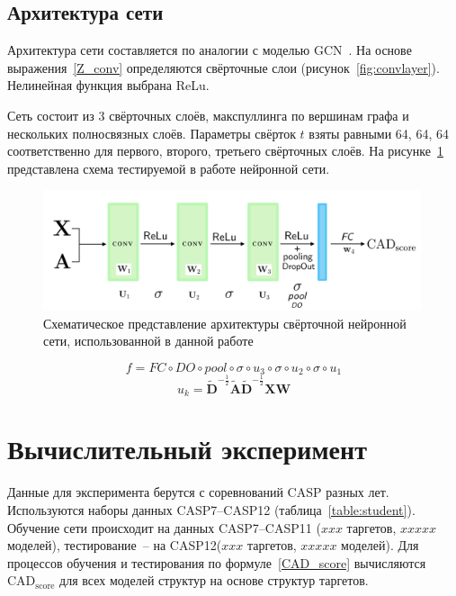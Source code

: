 \documentclass[14pt]{extarticle}
\begin{document}
\subsection{Архитектура сети}
Архитектура сети составляется по аналогии с моделью GCN~\cite{kipf_semi-supervised_2017}. На основе выражения~\eqref{Z_conv} определяются свёрточные слои (рисунок~\ref{fig:convlayer}). Нелинейная функция выбрана ReLu.

Сеть состоит из 3 свёрточных слоёв, макспуллинга по вершинам графа и нескольких полносвязных слоёв. Параметры свёрток $t$ взяты равными 64, 64, 64 соответственно для первого, второго, третьего свёрточных слоёв. На рисунке~\ref{fig:scheme} представлена схема тестируемой в работе нейронной сети.
\begin{figure}[h]
	\centering
	\includegraphics[width=0.99\textwidth]{net.pdf}
	\caption{Схематическое представление архитектуры свёрточной нейронной сети, использованной в данной работе}
	\label{fig:scheme}
\end{figure}
$$f = FC \circ DO \circ pool \circ \sigma \circ u_3\circ\sigma\circ u_2\circ\sigma\circ u_1$$
$$u_k = \tilde{\mathbf{D}}^{-\frac{1}{2}} \tilde{\mathbf{A}}\tilde{\mathbf{D}}^{-\frac{1}{2}} \mathbf{X} \mathbf{W}$$

\section{Вычислительный эксперимент}
Данные для эксперимента берутся с соревнований CASP разных лет. Используются наборы данных CASP7--CASP12 (таблица~\ref{table:student}). Обучение сети происходит на данных CASP7--CASP11 ($xxx$ таргетов, $xxxxx$ моделей), тестирование~-- на CASP12($xxx$ таргетов, $xxxxx$ моделей). Для процессов обучения и тестирования по формуле~\eqref{CAD_score} вычисляются $\text{CAD}_\text{score}$ для всех моделей структур на основе структур таргетов. 
\end{document}
